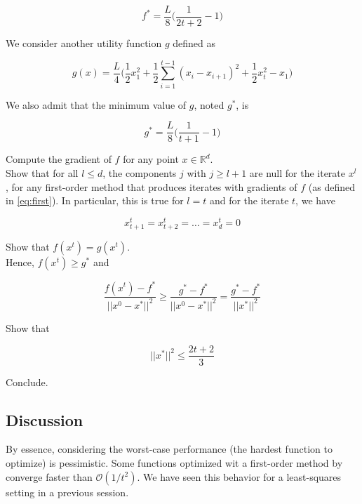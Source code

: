 \documentclass[
10pt, %
a4paper, %
oneside, %
headinclude,footinclude, %
BCOR5mm, %
]{scrartcl}
\begin{document}
\begin{equation}
    f^* = \frac{L}{8} \big( \frac{1}{2t+2} -1\big)
\end{equation}

We consider another utility function $g$ defined as

\begin{equation}
    g(x) = \frac{L}{4} \Big( \frac{1}{2} x_1^2 + \frac{1}{2} \sum^{t-1}_{i=1} (x_i-x_{i+1})^2+ \frac{1}{2} x_{t}^2-x_1 \Big)
\end{equation}

We also admit that the minimum value of $g$, noted $g^*$, is

\begin{equation}
    g^* = \frac{L}{8} \big( \frac{1}{t+1} -1\big) 
\end{equation}

\exercice{\textbf{}} Compute the gradient of $f$ for any point $x\in \mathbb{R}^d$.
\\


\exercice{\textbf{}} Show that for all $l\leq d$, the components $j$ with $j\geq l+1$ are null for the iterate $x^l$, for any first-order method that produces iterates with gradients of $f$ (as defined in \ref{eq:first}). In particular, this is true for $l=t$ and for the iterate $t$, we have

\begin{equation}
    x^t_{t+1} = x^t_{t+2} = \dots = x^t_d = 0   
\end{equation}

\exercice{\textbf{}}Show that $f(x^t)=g(x^t)$.
\\

Hence, $f(x^t)\geq g^*$ and 

\begin{equation}
    \frac{f(x^t)-f^*}{||x^0-x^*||^2} \geq \frac{g^*-f^*}{||x^0-x^*||^2} = \frac{g^*-f^*}{||x^*||^2}
\end{equation}

\exercice{\textbf{}}Show that

\begin{equation}
    ||x^*||^2\leq \frac{2t+2}{3} 
\end{equation}


\exercice{\textbf{}}Conclude.

\subsection{\large\color{MidnightBlue}Discussion}

By essence, considering the worst-case performance (the hardest function to optimize) is pessimistic. Some functions optimized wit a first-order method by converge faster than $ \mathcal{O}(1/t^2)$. We have seen this behavior for a least-squares setting in a previous session. 
\end{document}
